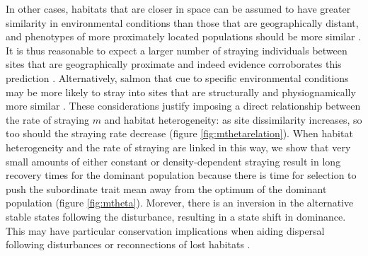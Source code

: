 \documentclass{revtex4}
\begin{document}
In other cases, habitats that are closer in space can be assumed to have greater similarity in environmental conditions than those that are geographically distant, and phenotypes of more proximately located populations should be more similar \citep{Westley:2012ui}.
It is thus reasonable to expect a larger number of straying individuals between sites that are geographically proximate and indeed evidence corroborates this prediction \citep{Candy:2000hu,JPE:JPE1383}.
Alternatively, salmon that cue to specific environmental conditions may be more likely to stray into sites that are structurally and physiognamically more similar \citep{Peterson:2014gy}.
These considerations justify imposing a direct relationship between the rate of straying $m$ and habitat heterogeneity: as site dissimilarity increases, so too should the straying rate decrease (figure \ref{fig:mthetarelation}).
When habitat heterogeneity and the rate of straying are linked in this way, we show that very small amounts of either constant or density-dependent straying result in long recovery times for the dominant population because there is time for selection to push the subordinate trait mean away from the optimum of the dominant population (figure \ref{fig:mtheta}). %
Morever, there is an inversion in the alternative stable states following the disturbance, resulting in a state shift in dominance.
This may have particular conservation implications when aiding dispersal following disturbances or reconnections of lost habitats \citep{Anderson:2013bf,Pess:2014isa}.
\end{document}
